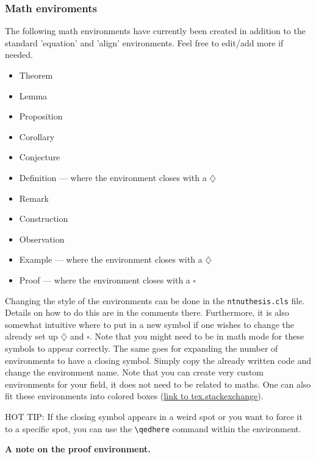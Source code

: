 \documentclass[../thesis.tex]{subfiles}
\begin{document}
\subsubsection{Math enviroments}
The following math environments have currently been created in addition to the standard 'equation' and 'align' environments. Feel free to edit/add more if needed.
\begin{itemize}
    \item Theorem
    \item Lemma
    \item Proposition
    \item Corollary
    \item Conjecture
    \item Definition — where the environment closes with a $\diamondsuit$
    \item Remark
    \item Construction
    \item Observation
    \item Example — where the environment closes with a $\diamondsuit$
    \item Proof — where the environment closes with a $\square$
\end{itemize}
Changing the style of the environments can be done in the \verb|ntnuthesis.cls| file. Details on how to do this are in the comments there. Furthermore, it is also somewhat intuitive where to put in a new symbol if one wishes to change the already set up $\diamondsuit$ and $\square$. Note that you might need to be in math mode for these symbols to appear correctly. The same goes for expanding the number of environments to have a closing symbol. Simply copy the already written code and change the environment name. Note that you can create very custom environments for your field, it does not need to be related to maths. One can also fit these environments into colored boxes (\href{https://tex.stackexchange.com/questions/94912/numbering-a-new-theorem}{link to tex.stackexchange}).

HOT TIP: If the closing symbol appears in a weird spot or you want to force it to a specific spot, you can use the \verb|\qedhere| command within the environment. 


\textbf{A note on the proof environment.}
\end{document}
